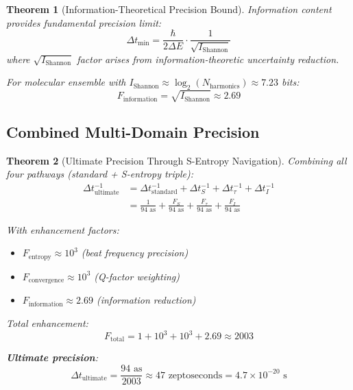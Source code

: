 \documentclass[12pt,a4paper]{article}
\newtheorem{theorem}{Theorem}[section]
\begin{document}
\begin{theorem}[Information-Theoretical Precision Bound]
Information content provides fundamental precision limit:
\begin{equation}
\Delta t_{\text{min}} = \frac{\hbar}{2 \Delta E} \cdot \frac{1}{\sqrt{I_{\text{Shannon}}}}
\end{equation}
where $\sqrt{I_{\text{Shannon}}}$ factor arises from information-theoretic uncertainty reduction.

For molecular ensemble with $I_{\text{Shannon}} \approx \log_2(N_{\text{harmonics}}) \approx 7.23$ bits:
\begin{equation}
F_{\text{information}} = \sqrt{I_{\text{Shannon}}} \approx 2.69
\end{equation}
\end{theorem}

\subsection{Combined Multi-Domain Precision}

\begin{theorem}[Ultimate Precision Through S-Entropy Navigation]
Combining all four pathways (standard + S-entropy triple):
\begin{align}
\Delta t_{\text{ultimate}}^{-1} &= \Delta t_{\text{standard}}^{-1} + \Delta t_S^{-1} + \Delta t_{\tau}^{-1} + \Delta t_I^{-1} \\
&= \frac{1}{94 \text{ as}} + \frac{F_S}{94 \text{ as}} + \frac{F_{\tau}}{94 \text{ as}} + \frac{F_I}{94 \text{ as}}
\end{align}

With enhancement factors:
\begin{itemize}
\item $F_{\text{entropy}} \approx 10^3$ (beat frequency precision)
\item $F_{\text{convergence}} \approx 10^3$ (Q-factor weighting)
\item $F_{\text{information}} \approx 2.69$ (information reduction)
\end{itemize}

Total enhancement:
\begin{equation}
F_{\text{total}} = 1 + 10^3 + 10^3 + 2.69 \approx 2003
\end{equation}

\textbf{Ultimate precision}:
\begin{equation}
\boxed{\Delta t_{\text{ultimate}} = \frac{94 \text{ as}}{2003} \approx 47 \text{ zeptoseconds} = 4.7 \times 10^{-20} \text{ s}}
\end{equation}
\end{theorem}
\end{document}
